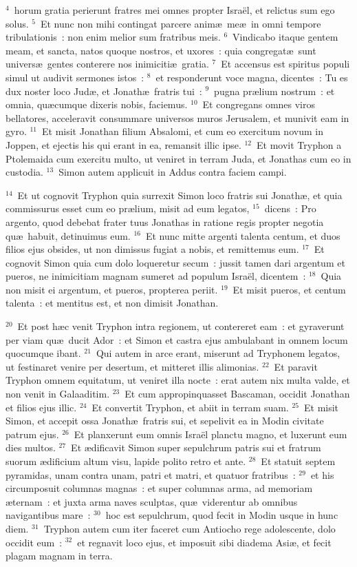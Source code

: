 ${}^{4}$~horum gratia perierunt fratres mei omnes propter Isra\"el, et relictus sum ego solus.
${}^{5}$~Et nunc non mihi contingat parcere anim\ae\ me\ae\ in omni tempore tribulationis~: non enim melior sum fratribus meis.
${}^{6}$~Vindicabo itaque gentem meam, et sancta, natos quoque nostros, et uxores~: quia congregat\ae\ sunt univers\ae\ gentes conterere nos inimiciti\ae\ gratia.
${}^{7}$~Et accensus est spiritus populi simul ut audivit sermones istos~:
${}^{8}$~et responderunt voce magna, dicentes~: Tu es dux noster loco Jud\ae , et Jonath\ae\ fratris tui~:
${}^{9}$~pugna pr\ae lium nostrum~: et omnia, qu\ae cumque dixeris nobis, faciemus.
${}^{10}$~Et congregans omnes viros bellatores, acceleravit consummare universos muros Jerusalem, et munivit eam in gyro.
${}^{11}$~Et misit Jonathan filium Absalomi, et cum eo exercitum novum in Joppen, et ejectis his qui erant in ea, remansit illic ipse.
${}^{12}$~Et movit Tryphon a Ptolemaida cum exercitu multo, ut veniret in terram Juda, et Jonathas cum eo in custodia.
${}^{13}$~Simon autem applicuit in Addus contra faciem campi.


${}^{14}$~Et ut cognovit Tryphon quia surrexit Simon loco fratris sui Jonath\ae , et quia commissurus esset cum eo pr\ae lium, misit ad eum legatos,
${}^{15}$~dicens~: Pro argento, quod debebat frater tuus Jonathas in ratione regis propter negotia qu\ae\ habuit, detinuimus eum.
${}^{16}$~Et nunc mitte argenti talenta centum, et duos filios ejus obsides, ut non dimissus fugiat a nobis, et remittemus eum.
${}^{17}$~Et cognovit Simon quia cum dolo loqueretur secum~: jussit tamen dari argentum et pueros, ne inimicitiam magnam sumeret ad populum Isra\"el, dicentem~:
${}^{18}$~Quia non misit ei argentum, et pueros, propterea periit.
${}^{19}$~Et misit pueros, et centum talenta~: et mentitus est, et non dimisit Jonathan.


${}^{20}$~Et post h\ae c venit Tryphon intra regionem, ut contereret eam~: et gyraverunt per viam qu\ae\ ducit Ador~: et Simon et castra ejus ambulabant in omnem locum quocumque ibant.
${}^{21}$~Qui autem in arce erant, miserunt ad Tryphonem legatos, ut festinaret venire per desertum, et mitteret illis alimonias.
${}^{22}$~Et paravit Tryphon omnem equitatum, ut veniret illa nocte~: erat autem nix multa valde, et non venit in Galaaditim.
${}^{23}$~Et cum appropinquasset Bascaman, occidit Jonathan et filios ejus illic.
${}^{24}$~Et convertit Tryphon, et abiit in terram suam.
${}^{25}$~Et misit Simon, et accepit ossa Jonath\ae\ fratris sui, et sepelivit ea in Modin civitate patrum ejus.
${}^{26}$~Et planxerunt eum omnis Isra\"el planctu magno, et luxerunt eum dies multos.
${}^{27}$~Et \ae dificavit Simon super sepulchrum patris sui et fratrum suorum \ae dificium altum visu, lapide polito retro et ante.
${}^{28}$~Et statuit septem pyramidas, unam contra unam, patri et matri, et quatuor fratribus~:
${}^{29}$~et his circumposuit columnas magnas~: et super columnas arma, ad memoriam \ae ternam~: et juxta arma naves sculptas, qu\ae\ viderentur ab omnibus navigantibus mare~:
${}^{30}$~hoc est sepulchrum, quod fecit in Modin usque in hunc diem.
${}^{31}$~Tryphon autem cum iter faceret cum Antiocho rege adolescente, dolo occidit eum~:
${}^{32}$~et regnavit loco ejus, et imposuit sibi diadema Asi\ae , et fecit plagam magnam in terra.


